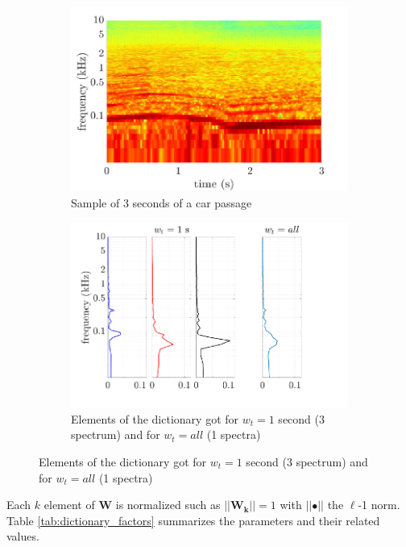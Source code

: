 \documentclass[twocolumn,a4paper,10pt]{article}
\begin{document}
\begin{figure}[t!]
    \centering
    \begin{subfigure}[t]{0.47\linewidth}
        \centering
       \includegraphics[width=\linewidth]{../image/dictionary1.pdf}
        \caption{Sample of 3 seconds of a car passage}
        \label{fig:TIR_class_filter}
    \end{subfigure}%
    \hfill
    \begin{subfigure}[t]{0.47\linewidth}
        \centering
       \includegraphics[width=\linewidth]{../image/dictionary2.pdf}
        \caption{Elements of the dictionary got for $w_t = 1$ second (3 spectrum) and  for $w_t = all$ (1 spectra) }
        \label{fig:TIR_class_filter}
    \end{subfigure}
\end{figure}


Each $k$ element of $\mathbf{W}$ is normalized such as $\vert \vert \mathbf{W_k} \vert \vert = 1$ with $\vert \vert \bullet \vert\vert$ the $\ell$-1 norm.\\
Table \ref{tab:dictionary_factors} summarizes the parameters and their related values.
\end{document}
